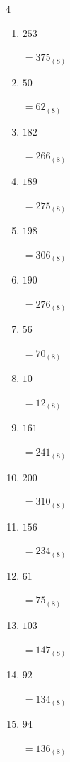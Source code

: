 \newpage
\resetdrill

\begin{multicols}{4}
\begin{enumerate}
  \itemsep=10pt
  \item $253$

        $=375_{(8)}$

  \item $50$

        $=62_{(8)}$

  \item $182$

        $=266_{(8)}$

  \item $189$

        $=275_{(8)}$

  \item $198$

        $=306_{(8)}$

  \item $190$

        $=276_{(8)}$

  \item $56$

        $=70_{(8)}$

  \item $10$

        $=12_{(8)}$

  \item $161$

        $=241_{(8)}$

  \item $200$

        $=310_{(8)}$

  \item $156$

        $=234_{(8)}$

  \item $61$

        $=75_{(8)}$

  \item $103$

        $=147_{(8)}$

  \item $92$

        $=134_{(8)}$

  \item $94$

        $=136_{(8)}$

\columnbreak %


\end{enumerate}
\end{multicols}
